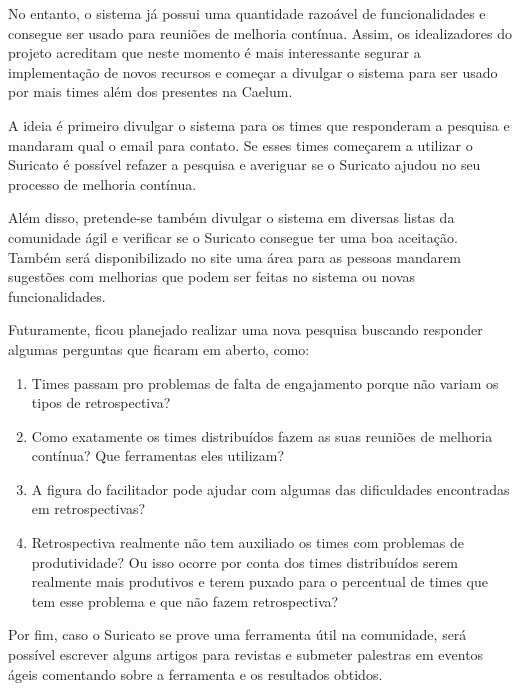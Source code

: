 No entanto, o sistema já possui uma quantidade razoável de funcionalidades e consegue ser usado para reuniões de melhoria contínua. Assim, os idealizadores do projeto acreditam que neste momento é mais interessante segurar a implementação de novos recursos e começar a divulgar o sistema para ser usado por mais times além dos presentes na Caelum.

A ideia é primeiro divulgar o sistema para os times que responderam a pesquisa e mandaram qual o email para contato. Se esses times começarem a utilizar o Suricato é possível refazer a pesquisa e averiguar se o Suricato ajudou no seu processo de melhoria contínua.

Além disso, pretende-se também divulgar o sistema em diversas listas da comunidade ágil e verificar se o Suricato consegue ter uma boa aceitação. Também será disponibilizado no site uma área para as pessoas mandarem sugestões com melhorias que podem ser feitas no sistema ou novas funcionalidades.

Futuramente, ficou planejado realizar uma nova pesquisa buscando responder algumas perguntas que ficaram em aberto, como:

\begin{enumerate}
	\item Times passam pro problemas de falta de engajamento porque não variam os tipos de retrospectiva?
	\item Como exatamente os times distribuídos fazem as suas reuniões de melhoria contínua? Que ferramentas eles utilizam?
	\item A figura do facilitador pode ajudar com algumas das dificuldades encontradas em retrospectivas?
	\item Retrospectiva realmente não tem auxiliado os times com problemas de produtividade? Ou isso ocorre por conta dos times distribuídos serem realmente mais produtivos e terem puxado para  o percentual de times que tem esse problema e que não fazem retrospectiva?
\end{enumerate}

Por fim, caso o Suricato se prove uma ferramenta útil na comunidade, será possível escrever alguns artigos para revistas e submeter palestras em eventos ágeis comentando sobre a ferramenta e os resultados obtidos. 